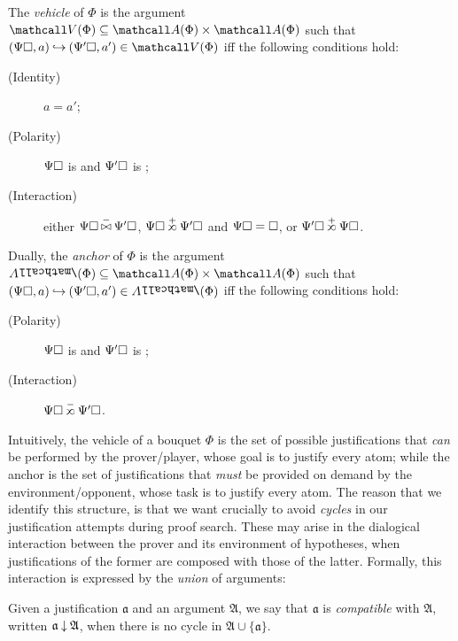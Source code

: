 \begin{scope}
\begin{definition}
  The \emph{vehicle} of $\Phi$ is the argument $\vehicle{\Phi} \subseteq
  \atomoccs{\Phi} \times \atomoccs{\Phi}$ such that $(\Psi\hole, a) \justi
  (\Psi'\hole, a') \in \vehicle{\Phi}$ iff the following conditions hold:
  \begin{description}
    \item[(Identity)] $a = a'$;
    \item[(Polarity)] $\Psi\square$ is  and $\Psi'\square$ is
    ;
    \item[(Interaction)] either $\Psi\hole \cinterneg \Psi'\hole$,
    $\Psi\hole \sinterpos \Psi'\hole$ and $\Psi\square = \square$, or $\Psi'\hole
    \sinterpos \Psi\hole$.
  \end{description}

  Dually, the \emph{anchor} of $\Phi$ is the argument $\anchor{\Phi} \subseteq
  \atomoccs{\Phi} \times \atomoccs{\Phi}$ such that $(\Psi\hole, a) \justi
  (\Psi'\hole, a') \in \anchor{\Phi}$ iff the following conditions hold:
  \begin{description}
    \item[(Polarity)] $\Psi\square$ is  and $\Psi'\square$ is
    ;
    \item[(Interaction)] $\Psi\hole \sinterneg \Psi'\hole$.
  \end{description}
\end{definition}

Intuitively, the vehicle of a bouquet $\Phi$ is the set of possible
justifications that \emph{can} be performed by the prover/player, whose goal is
to justify every  atom; while the anchor is the set of justifications
that \emph{must} be provided on demand by the environment/opponent, whose task
is to justify every  atom. The reason that we identify this structure,
is that we want crucially to avoid \emph{cycles} in our justification attempts
during proof search. These may arise in the dialogical interaction between the
prover and its environment of hypotheses, when justifications of the former are
composed with those of the latter. Formally, this interaction is expressed by
the \emph{union} of arguments:

\begin{definition}[Compatibility]
  Given a justification $\mathfrak{a}$ and an argument $\mathfrak{A}$, we say
  that $\mathfrak{a}$ is \emph{compatible} with $\mathfrak{A}$, written
  $\mathfrak{a} \mathbin{\downarrow} \mathfrak{A}$, when there is no cycle in $\mathfrak{A}
  \cup \{\mathfrak{a}\}$.
\end{definition}


\end{scope}
